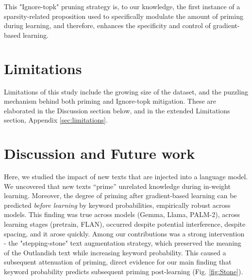 \documentclass[11pt, a4paper, logo, copyright]{googledeepmind}
\theoremstyle{plain}
\theoremstyle{definition}
\theoremstyle{remark}
\begin{document}


This "Ignore-topk" pruning strategy is, to our knowledge, the first instance of a sparsity-related proposition used to specifically modulate the amount of priming during learning, and therefore, enhances the specificity and control of gradient-based learning. 


  



\section{Limitations} %
Limitations of this study include the growing size of the dataset, and the puzzling mechanism behind both priming and Ignore-topk mitigation. These are elaborated in the Discussion section below, and in the extended Limitations section, Appendix \ref{sec:limitations}. 



\section{Discussion and Future work}

Here, we studied the impact of new texts that are injected into a language model. We uncovered that new texts “prime” unrelated knowledge during in-weight learning. Moreover, the degree of priming after gradient-based learning can be predicted \textit{before learning} by keyword probabilities, empirically robust across models. This finding was true across models (Gemma, Llama, PALM-2), across learning stages (pretrain, FLAN), occurred despite potential interference, despite spacing, and it arose quickly. Among our contributions was a strong intervention - the "stepping-stone" text augmentation strategy, which preserved the meaning of the Outlandish text while increasing keyword probability. This caused a subsequent attenuation of priming, direct evidence for our main finding that keyword probability predicts subsequent priming post-learning (Fig. \ref{fig:Stone}). 
\end{document}
